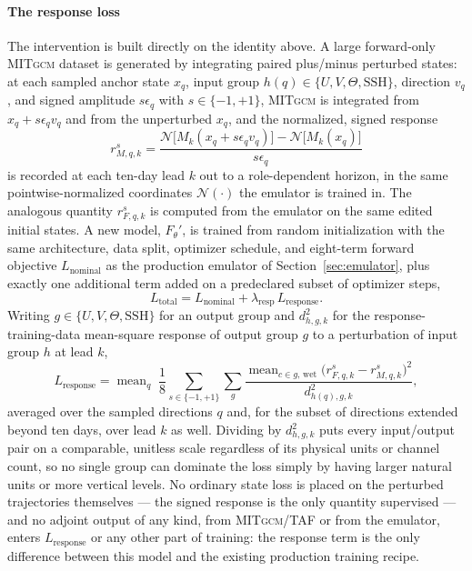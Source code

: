 \documentclass[3p,12pt]{elsarticle}
\newcommand{\MITgcm}{\textsc{MITgcm}}
\begin{document}
\paragraph{The response loss} The intervention is built directly on the
identity above. A large forward-only \MITgcm{} dataset is generated by
integrating paired plus/minus perturbed states: at each sampled anchor state
$x_q$, input group $h(q)\in\{U,V,\Theta,\mathrm{SSH}\}$, direction $v_q$, and
signed amplitude $s\epsilon_q$ with $s\in\{-1,+1\}$, \MITgcm{} is integrated
from $x_q+s\epsilon_q v_q$ and from the unperturbed $x_q$, and the normalized,
signed response
\[
r_{M,q,k}^{s} = \frac{\mathcal N\bigl[M_k(x_q+s\epsilon_q v_q)\bigr]-\mathcal N\bigl[M_k(x_q)\bigr]}{s\epsilon_q}
\]
is recorded at each ten-day lead $k$ out to a role-dependent horizon, in the
same pointwise-normalized coordinates $\mathcal N(\cdot)$ the emulator is
trained in. The analogous quantity $r_{F,q,k}^{s}$ is computed from the
emulator on the same edited initial states. A new model, $F_\theta'$, is
trained from random initialization with the same architecture, data split,
optimizer schedule, and eight-term forward objective $L_{\mathrm{nominal}}$ as
the production emulator of Section~\ref{sec:emulator}, plus exactly one
additional term added on a predeclared subset of optimizer steps,
\[
L_{\mathrm{total}} = L_{\mathrm{nominal}} + \lambda_{\mathrm{resp}}\,L_{\mathrm{response}}.
\]
Writing $g\in\{U,V,\Theta,\mathrm{SSH}\}$ for an output group and
$d_{h,g,k}^2$ for the response-training-data mean-square response of output
group $g$ to a perturbation of input group $h$ at lead $k$,
\[
L_{\mathrm{response}} = \operatorname{mean}_{q}\;\frac{1}{8}\sum_{s\in\{-1,+1\}}\sum_{g}
\frac{\operatorname{mean}_{c\in g,\,\mathrm{wet}}\bigl(r_{F,q,k}^{s}-r_{M,q,k}^{s}\bigr)^2}{d_{h(q),g,k}^2},
\]
averaged over the sampled directions $q$ and, for the subset of directions
extended beyond ten days, over lead $k$ as well. Dividing by $d_{h,g,k}^2$
puts every input/output pair on a comparable, unitless scale regardless of
its physical units or channel count, so no single group can dominate the
loss simply by having larger natural units or more vertical levels. No
ordinary state loss is placed on the perturbed trajectories themselves --- the
signed response is the only quantity supervised --- and no adjoint output of
any kind, from \MITgcm{}/TAF or from the emulator, enters $L_{\mathrm{response}}$
or any other part of training: the response term is the only difference
between this model and the existing production training recipe.
\end{document}
